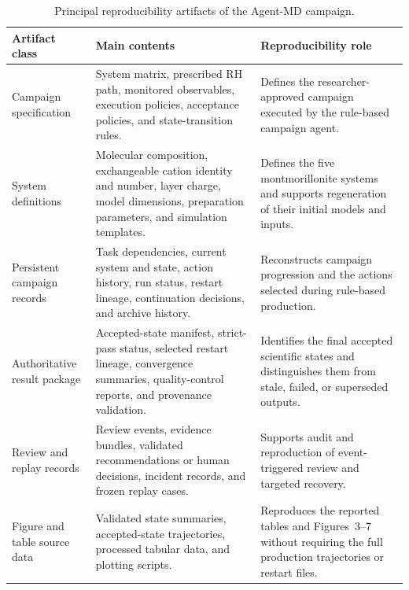 \begin{table}[p]
\centering
\footnotesize
\setlength{\tabcolsep}{4pt}
\renewcommand{\arraystretch}{0.95}
\caption{Principal reproducibility artifacts of the Agent-MD campaign.}
\label{tab:repo_artifacts}
\begin{tabular}{p{}p{}p{}}
\toprule
Artifact class & Main contents & Reproducibility role \\
\midrule
Campaign specification & System matrix, prescribed RH path, monitored observables, execution policies, acceptance policies, and state-transition rules. & Defines the researcher-approved campaign executed by the rule-based campaign agent. \\
System definitions & Molecular composition, exchangeable cation identity and number, layer charge, model dimensions, preparation parameters, and simulation templates. & Defines the five montmorillonite systems and supports regeneration of their initial models and inputs. \\
Persistent campaign records & Task dependencies, current system and state, action history, run status, restart lineage, continuation decisions, and archive history. & Reconstructs campaign progression and the actions selected during rule-based production. \\
Authoritative result package & Accepted-state manifest, strict-pass status, selected restart lineage, convergence summaries, quality-control reports, and provenance validation. & Identifies the final accepted scientific states and distinguishes them from stale, failed, or superseded outputs. \\
Review and replay records & Review events, evidence bundles, validated recommendations or human decisions, incident records, and frozen replay cases. & Supports audit and reproduction of event-triggered review and targeted recovery. \\
Figure and table source data & Validated state summaries, accepted-state trajectories, processed tabular data, and plotting scripts. & Reproduces the reported tables and Figures~3--7 without requiring the full production trajectories or restart files. \\
\bottomrule
\end{tabular}
\end{table}
\FloatBarrier

